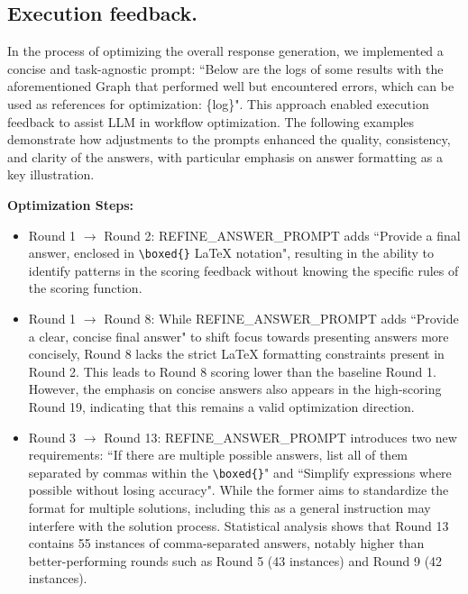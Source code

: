 \documentclass{article} %
\theoremstyle{plain}
\theoremstyle{definition}
\theoremstyle{remark}
\begin{document}
\subsection{Execution feedback.}

In the process of optimizing the overall response generation, we implemented a concise and task-agnostic prompt: ``Below are the logs of some results with the aforementioned Graph that performed well but encountered errors, which can be used as references for optimization: \{log\}". This approach enabled execution feedback to assist LLM in workflow optimization. The following examples demonstrate how adjustments to the prompts enhanced the quality, consistency, and clarity of the answers, with particular emphasis on answer formatting as a key illustration.

\textbf{Optimization Steps:}
\begin{itemize}[leftmargin=20pt]
    \item {Round 1 $\rightarrow$ Round 2}: REFINE\_ANSWER\_PROMPT adds ``Provide a final answer, enclosed in \texttt{\textbackslash boxed\{\}} LaTeX notation", resulting in the ability to identify patterns in the scoring feedback without knowing the specific rules of the scoring function.

    \item {Round 1 $\rightarrow$ Round 8}: While REFINE\_ANSWER\_PROMPT adds ``Provide a clear, concise final answer" to shift focus towards presenting answers more concisely, Round 8 lacks the strict LaTeX formatting constraints present in Round 2. This leads to Round 8 scoring lower than the baseline Round 1. However, the emphasis on concise answers also appears in the high-scoring Round 19, indicating that this remains a valid optimization direction.
    
    \item {Round 3 $\rightarrow$ Round 13}: REFINE\_ANSWER\_PROMPT introduces two new requirements: ``If there are multiple possible answers, list all of them separated by commas within the \texttt{\textbackslash boxed\{\}}" and ``Simplify expressions where possible without losing accuracy". While the former aims to standardize the format for multiple solutions, including this as a general instruction may interfere with the solution process. Statistical analysis shows that Round 13 contains 55 instances of comma-separated answers, notably higher than better-performing rounds such as Round 5 (43 instances) and Round 9 (42 instances).
    
\end{itemize}
\newpage
\end{document}
